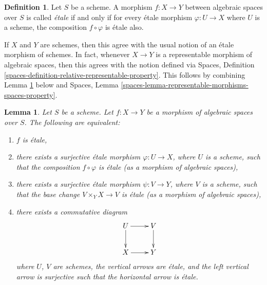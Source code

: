 \documentclass{stacks-project}
\theoremstyle{plain}
\newtheorem{lemma}[subsection]{Lemma}
\theoremstyle{definition}
\newtheorem{definition}[subsection]{Definition}
\theoremstyle{remark}
\numberwithin{equation}{subsection}
\begin{document}
\begin{definition}
\label{definition-etale}
Let $S$ be a scheme.
A morphism $f : X \to Y$ between algebraic spaces over $S$ is
called {\it \'etale} if and only if for every \'etale morphism
$\varphi : U \to X$ where $U$ is a scheme, the composition
$f \circ \varphi$ is \'etale also.
\end{definition}

\noindent
If $X$ and $Y$ are schemes, then this agree with the usual notion of an
\'etale morphism of schemes. In fact, whenever $X \to Y$ is a representable
morphism of algebraic spaces, then this agrees with the notion defined via
Spaces, Definition \ref{spaces-definition-relative-representable-property}.
This follows by combining Lemma \ref{lemma-etale-local} below and
Spaces, Lemma \ref{spaces-lemma-representable-morphisms-spaces-property}.

\begin{lemma}
\label{lemma-etale-local}
Let $S$ be a scheme.
Let $f : X \to Y$ be a morphism of algebraic spaces over $S$.
The following are equivalent:
\begin{enumerate}
\item $f$ is \'etale,
\item there exists a surjective \'etale morphism $\varphi : U \to X$,
where $U$ is a scheme, such that the composition $f \circ \varphi$ is
\'etale (as a morphism of algebraic spaces),
\item there exists a surjective \'etale morphism $\psi : V \to Y$,
where $V$ is a scheme, such that the base change $V \times_Y X \to V$
is \'etale (as a morphism of algebraic spaces),
\item there exists a commutative diagram
$$
\xymatrix{
U \ar[d] \ar[r] & V \ar[d] \\
X \ar[r] & Y
}
$$
where $U$, $V$ are schemes, the vertical arrows are \'etale, and the
left vertical arrow is surjective such that the horizontal arrow is \'etale.
\end{enumerate}
\end{lemma}
\end{document}
